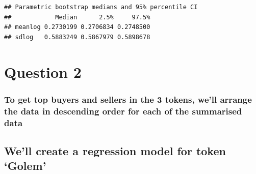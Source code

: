 \documentclass[]{article}
\newenvironment{Shaded}{\begin{snugshade}}{\end{snugshade}}
\newcommand{\KeywordTok}[1]{\textcolor[rgb]{0.13,0.29,0.53}{\textbf{#1}}}
\newcommand{\StringTok}[1]{\textcolor[rgb]{0.31,0.60,0.02}{#1}}
\newcommand{\OperatorTok}[1]{\textcolor[rgb]{0.81,0.36,0.00}{\textbf{#1}}}
\newcommand{\NormalTok}[1]{#1}
\begin{document}
\begin{verbatim}
## Parametric bootstrap medians and 95% percentile CI 
##            Median      2.5%     97.5%
## meanlog 0.2730199 0.2706834 0.2748500
## sdlog   0.5883249 0.5867979 0.5898678
\end{verbatim}

\section{Question 2}\label{question-2}

\subsubsection{To get top buyers and sellers in the 3 tokens, we'll
arrange the data in descending order for each of the summarised
data}\label{to-get-top-buyers-and-sellers-in-the-3-tokens-well-arrange-the-data-in-descending-order-for-each-of-the-summarised-data}

\begin{Shaded}
\end{Shaded}

\subsection{\texorpdfstring{We'll create a regression model for token
`Golem'}{We'll create a regression model for token Golem}}\label{well-create-a-regression-model-for-token-golem}
\end{document}
